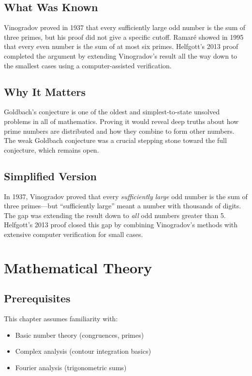 \subsection{What Was Known}
Vinogradov proved in 1937 that every sufficiently large odd number is the sum of three primes, but his proof did not give a specific cutoff. Ramar\'e showed in 1995 that every even number is the sum of at most six primes. Helfgott's 2013 proof completed the argument by extending Vinogradov's result all the way down to the smallest cases using a computer-assisted verification.

\subsection{Why It Matters}
Goldbach's conjecture is one of the oldest and simplest-to-state unsolved problems in all of mathematics. Proving it would reveal deep truths about how prime numbers are distributed and how they combine to form other numbers. The weak Goldbach conjecture was a crucial stepping stone toward the full conjecture, which remains open.

\subsection{Simplified Version}
In 1937, Vinogradov proved that every \emph{sufficiently large} odd number is the sum of three primes---but ``sufficiently large'' meant a number with thousands of digits. The gap was extending the result down to \emph{all} odd numbers greater than 5. Helfgott's 2013 proof closed this gap by combining Vinogradov's methods with extensive computer verification for small cases.

\section{Mathematical Theory}


\subsection{Prerequisites}
This chapter assumes familiarity with:
\begin{itemize}
\item Basic number theory (congruences, primes)
\item Complex analysis (contour integration basics)
\item Fourier analysis (trigonometric sums)
\end{itemize}

